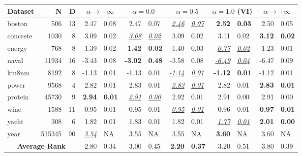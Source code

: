 \centering
{}
\label{tab:bnn_ll}
\begin{tabular}{l@{\ica}r@{\ica}r@{\ica}r@{$\pm$}l@{\ica}r@{$\pm$}l@{\ica}r@{$\pm$}l@{\ica}r@{$\pm$}l@{\ica}r@{$\pm$}l@{\ica}}
\hline
\bf{Dataset}&{N}&{D}&\multicolumn{2}{c}{\bf{$\alpha \rightarrow -\infty$}}&\multicolumn{2}{c}{\bf{$\alpha = 0.0$}}&\multicolumn{2}{c}{\bf{$\alpha = 0.5$}}&\multicolumn{2}{c}{\bf{$\alpha = 1.0$ (VI)}}&\multicolumn{2}{c}{\bf{$\alpha \rightarrow +\infty$}}\\
\hline
boston&506&13&2.47&0.08&2.47&0.07&\underline{\textit{2.46}}&\underline{\textit{0.07}}&\textbf{2.52}&\textbf{0.03}&2.50&0.05\\
concrete&1030&8&3.09&0.02&\underline{\textit{3.08}}&\underline{\textit{0.02}}&3.09&0.02&3.11&0.02&\textbf{3.12}&\textbf{0.02}\\
energy&768&8&1.39&0.02&\textbf{1.42}&\textbf{0.02}&1.40&0.03&\underline{\textit{0.77}}&\underline{\textit{0.02}}&1.23&0.01\\
naval&11934&16&-3.43&0.08&\textbf{-3.02}&\textbf{0.48}&-3.58&0.08&\underline{\textit{-6.49}}&\underline{\textit{0.04}}&-6.47&0.09\\
kin8nm&8192&8&-1.13&0.01&-1.13&0.01&\underline{\textit{-1.14}}&\underline{\textit{0.01}}&\textbf{-1.12}&\textbf{0.01}&-1.12&0.01\\
power&9568&4&2.82&0.01&2.83&0.01&\underline{\textit{2.82}}&\underline{\textit{0.01}}&2.82&0.01&\textbf{2.83}&\textbf{0.01}\\
protein&45730&9&\textbf{2.94}&\textbf{0.01}&\underline{\textit{2.91}}&\underline{\textit{0.00}}&2.92&0.01&2.91&0.00&2.91&0.00\\
wine&1588&11&0.95&0.01&0.95&0.01&\underline{\textit{0.95}}&\underline{\textit{0.01}}&0.96&0.01&\textbf{0.97}&\textbf{0.01}\\
yacht&308&6&1.82&0.01&1.83&0.01&1.82&0.01&\underline{\textit{1.77}}&\underline{\textit{0.01}}&\textbf{2.01}&\textbf{0.00}\\
year&515345&90&\underline{\textit{3.54}}&NA&3.55&NA&3.55&NA&\textbf{3.60}&NA&3.60&NA\\
\hline
\multicolumn{3}{c}{\textbf{Average Rank}}&2.80&0.34&3.00&0.45&\textbf{2.20}&\textbf{0.37}&3.20&0.51&3.80&0.39\\
\hline
\end{tabular}
